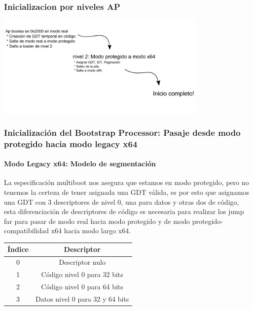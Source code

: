 \documentclass{beamer}
\begin{document}
	\begin{frame}
		\frametitle{Inicializacion por niveles AP}
		\begin{center}
			\includegraphics[height=5cm]{images/ap-stages-diagram.pdf} 
		\end{center}
	\end{frame}

	\begin{frame}
		\frametitle{Inicialización del Bootstrap Processor: Pasaje desde modo protegido hacia modo legacy x64}
	    \framesubtitle{Modo Legacy x64: Modelo de segmentación}    
	    La especificación multiboot nos asegura que estamos en modo protegido, pero no tenemos la certeza de tener asignada una GDT válida, es por esto que asignamos una GDT con 
	    3 descriptores de nivel 0, una para datos y otras dos de código, esta diferenciación de descriptores de código es necesaria para realizar los jump far para pasar de modo real hacia modo protegido y de modo protegido-compatibilidad x64 hacia modo largo x64.

		\vspace{0.5cm}
		\begin{center}
		    \begin{tabular}{|c|c|}
		        \hline
		        Índice & Descriptor\\
		        \hline
		        0 & Descriptor nulo\\
		        \hline
		        1 & Código nivel 0 para 32 bits\\
		        \hline
		        2 & Código nivel 0 para 64 bits\\
		        \hline
		        3 & Datos nivel 0 para 32 y 64 bits\\
		        \hline
		    \end{tabular}
		\end{center}
		\vspace{0.5cm}
	\end{frame}
\end{document}
